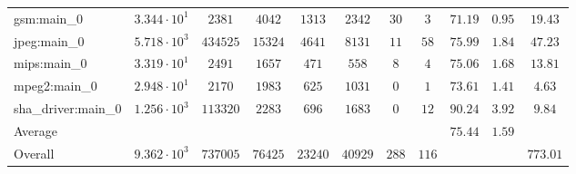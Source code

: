 \begin{tabular}{|l|c|c|c|c|c|c|c|c|c|c|}
gsm:main\_0             & $ 3.344 \cdot 10^{1} $ & $ 2381   $ & $ 4042  $ & $ 1313  $ & $ 2342  $ & $ 30  $ & $ 3   $ & $ 71.19       $ & $ 0.95    $ & $ 19.43   $ \\
jpeg:main\_0            & $ 5.718 \cdot 10^{3} $ & $ 434525 $ & $ 15324 $ & $ 4641  $ & $ 8131  $ & $ 11  $ & $ 58  $ & $ 75.99       $ & $ 1.84    $ & $ 47.23   $ \\
mips:main\_0            & $ 3.319 \cdot 10^{1} $ & $ 2491   $ & $ 1657  $ & $ 471   $ & $ 558   $ & $ 8   $ & $ 4   $ & $ 75.06       $ & $ 1.68    $ & $ 13.81   $ \\
mpeg2:main\_0           & $ 2.948 \cdot 10^{1} $ & $ 2170   $ & $ 1983  $ & $ 625   $ & $ 1031  $ & $ 0   $ & $ 1   $ & $ 73.61       $ & $ 1.41    $ & $ 4.63    $ \\
sha\_driver:main\_0     & $ 1.256 \cdot 10^{3} $ & $ 113320 $ & $ 2283  $ & $ 696   $ & $ 1683  $ & $ 0   $ & $ 12  $ & $ 90.24       $ & $ 3.92    $ & $ 9.84    $ \\
\hline
Average                 & $                    $ & $        $ & $       $ & $       $ & $       $ & $     $ & $     $ & $ 75.44       $ & $ 1.59    $ & $         $ \\
\hline
Overall                 & $ 9.362 \cdot 10^{3} $ & $ 737005 $ & $ 76425 $ & $ 23240 $ & $ 40929 $ & $ 288 $ & $ 116 $ & $             $ & $         $ & $ 773.01  $ \\
\hline
\end{tabular}
